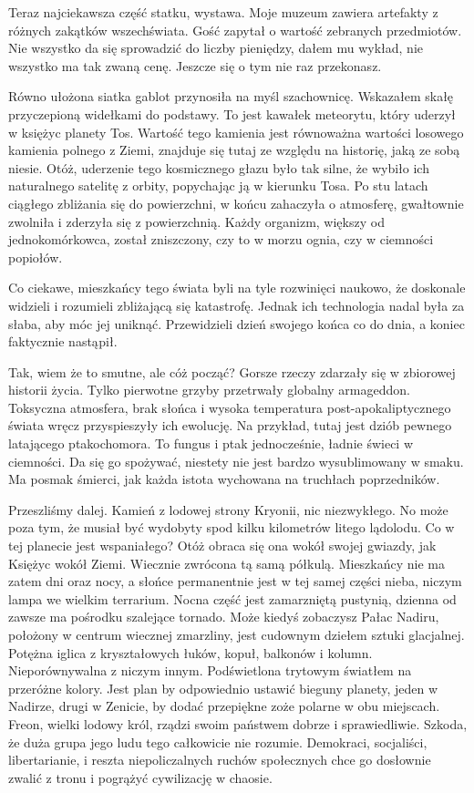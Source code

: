 Teraz najciekawsza część statku, wystawa.
Moje muzeum zawiera artefakty z różnych zakątków wszechświata. Gość zapytał o wartość zebranych przedmiotów.
Nie wszystko da się sprowadzić do liczby pieniędzy, dałem mu wykład, nie wszystko ma tak zwaną cenę. 
Jeszcze się o tym nie raz przekonasz.

Równo ułożona siatka gablot przynosiła na myśl szachownicę.
Wskazałem skałę przyczepioną widełkami do podstawy. 
To jest kawałek meteorytu, który uderzył w księżyc planety Tos. Wartość tego kamienia jest równoważna wartości losowego kamienia polnego z Ziemi, 
znajduje się tutaj ze względu na historię, jaką ze sobą niesie.
Otóż, uderzenie tego kosmicznego głazu było tak silne, że wybiło ich naturalnego satelitę z orbity, popychając ją w kierunku Tosa.
Po stu latach ciągłego zbliżania się do powierzchni, w końcu zahaczyła o atmosferę, gwałtownie zwolniła i zderzyła się z powierzchnią.
Każdy organizm, większy od jednokomórkowca, został zniszczony, czy to w morzu ognia, czy w ciemności popiołów.

Co ciekawe, mieszkańcy tego świata byli na tyle rozwinięci naukowo, że doskonale widzieli i rozumieli zbliżającą się katastrofę.
Jednak ich technologia nadal była za słaba, aby móc jej uniknąć.
Przewidzieli dzień swojego końca co do dnia, a koniec faktycznie nastąpił.

Tak, wiem że to smutne, ale cóż począć? Gorsze rzeczy zdarzały się w zbiorowej historii życia. 
Tylko pierwotne grzyby przetrwały globalny armageddon.
Toksyczna atmosfera, brak słońca i wysoka temperatura post-apokaliptycznego świata wręcz przyspieszyły ich ewolucję.
Na przykład, tutaj jest dziób pewnego latającego ptakochomora. To fungus i ptak jednocześnie, ładnie świeci w ciemności.
Da się go spożywać, niestety nie jest bardzo wysublimowany w smaku. 
Ma posmak śmierci, jak każda istota wychowana na truchłach poprzedników.

Przeszliśmy dalej. Kamień z lodowej strony Kryonii, nic niezwykłego. 
No może poza tym, że musiał być wydobyty spod kilku kilometrów litego lądolodu.
Co w tej planecie jest wspaniałego? Otóż obraca się ona wokół swojej gwiazdy, jak Księżyc wokół Ziemi. 
Wiecznie zwrócona tą samą półkulą.
Mieszkańcy nie ma zatem dni oraz nocy, a słońce permanentnie jest w tej samej części nieba, niczym lampa we wielkim terrarium.
Nocna część jest zamarzniętą pustynią, dzienna od zawsze ma pośrodku szalejące tornado.
Może kiedyś zobaczysz Pałac Nadiru, położony w centrum wiecznej zmarzliny, jest cudownym dziełem sztuki glacjalnej.
Potężna iglica z kryształowych łuków, kopuł, balkonów i kolumn. Nieporównywalna z niczym innym.
Podświetlona trytowym światłem na przeróżne kolory. 
Jest plan by odpowiednio ustawić bieguny planety, jeden w Nadirze, drugi w Zenicie, by dodać przepiękne zoże polarne w obu miejscach.
Freon, wielki lodowy król, rządzi swoim państwem dobrze i sprawiedliwie.
Szkoda, że duża grupa jego ludu tego całkowicie nie rozumie. 
Demokraci, socjaliści, libertarianie, i reszta niepoliczalnych ruchów społecznych chce go dosłownie zwalić z tronu i pogrążyć cywilizację w chaosie.

